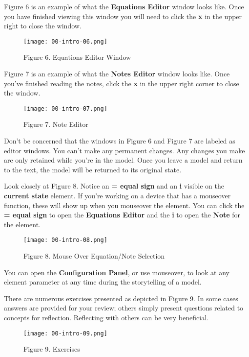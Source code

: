 \documentclass[]{memoir}
\let\Oldincludegraphics\includegraphics
\renewcommand{\includegraphics}[1]{\Oldincludegraphics[max size={\textwidth}{\textheight}]{#1}}
\begin{document}
Figure 6 is an example of what the \textbf{Equations Editor} window
looks like. Once you have finished viewing this window you will need to
click the \textbf{x} in the upper right to close the window.

\begin{figure}[htbp]
\centering
\texttt{[image: 00-intro-06.png]}
\caption{Figure 6. Equations Editor Window}
\end{figure}

Figure 7 is an example of what the \textbf{Notes Editor} window looks
like. Once you've finished reading the notes, click the \textbf{x} in
the upper right corner to close the window.

\begin{figure}[htbp]
\centering
\texttt{[image: 00-intro-07.png]}
\caption{Figure 7. Note Editor}
\end{figure}

Don't be concerned that the windows in Figure 6 and Figure 7 are labeled
as editor windows. You can't make any permanent changes. Any changes you
make are only retained while you're in the model. Once you leave a model
and return to the text, the model will be returned to its original
state.

Look closely at Figure 8. Notice an \textbf{= equal sign} and an
\textbf{i} visible on the \textbf{current state} element. If you're
working on a device that has a mouseover function, these will show up
when you mouseover the element. You can click the \textbf{= equal sign}
to open the \textbf{Equations Editor} and the \textbf{i} to open the
\textbf{Note} for the element.

\begin{figure}[htbp]
\centering
\texttt{[image: 00-intro-08.png]}
\caption{Figure 8. Mouse Over Equation/Note Selection}
\end{figure}

You can open the \textbf{Configuration Panel}, or use mouseover, to look
at any element parameter at any time during the storytelling of a model.

There are numerous exercises presented as depicted in Figure 9. In some
cases answers are provided for your review; others simply present
questions related to concepts for reflection. Reflecting with others can
be very beneficial.

\begin{figure}[htbp]
\centering
\texttt{[image: 00-intro-09.png]}
\caption{Figure 9. Exercises}
\end{figure}
\end{document}
